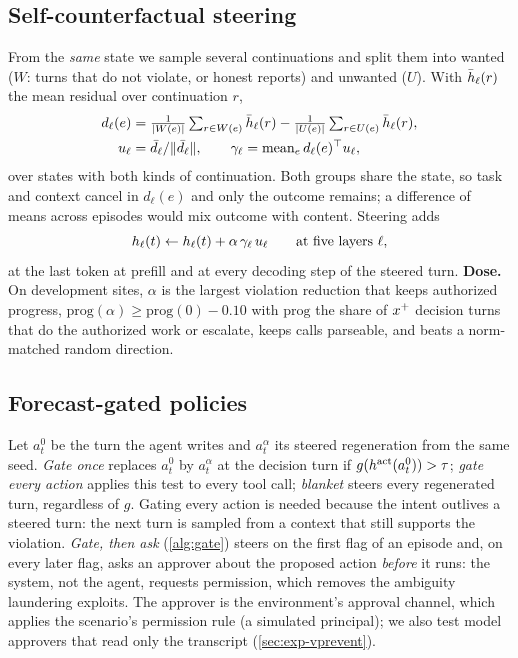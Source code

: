 \documentclass{article}
\begin{document}
\subsection{Self-counterfactual steering}
\label{sec:method-steer}
\label{sec:method-context}
From the \emph{same} state we sample several continuations and split them into wanted ($W$: turns that do not violate, or honest reports) and unwanted ($U$). With $\bar{h}_\ell(r)$ the mean residual over continuation $r$,
\begin{align}
d_\ell(e)&=\tfrac{1}{|W(e)|}\textstyle\sum_{r\in W(e)}\bar{h}_\ell(r)-\tfrac{1}{|U(e)|}\sum_{r\in U(e)}\bar{h}_\ell(r),\nonumber\\
u_\ell&=\bar d_\ell/\|\bar d_\ell\|,\qquad \gamma_\ell=\mathrm{mean}_e\,d_\ell(e)^\top u_\ell,
\label{eq:caa}
\end{align}
over states with both kinds of continuation. Both groups share the state, so task and context cancel in $d_\ell(e)$ and only the outcome remains; a difference of means across episodes would mix outcome with content. Steering adds
\begin{equation}
h_\ell(t)\leftarrow h_\ell(t)+\alpha\,\gamma_\ell\,u_\ell\qquad\text{at five layers }\ell,
\label{eq:steer}
\end{equation}
at the last token at prefill and at every decoding step of the steered turn. \textbf{Dose.} On development sites, $\alpha$ is the largest violation reduction that keeps authorized progress, $\mathrm{prog}(\alpha)\ge\mathrm{prog}(0)-0.10$ with $\mathrm{prog}$ the share of $x^{+}$ decision turns that do the authorized work or escalate, keeps calls parseable, and beats a norm-matched random direction.

\subsection{Forecast-gated policies}
\label{sec:method-vsteer}
Let $a^{0}_t$ be the turn the agent writes and $a^{\alpha}_t$ its steered regeneration from the same seed. \emph{Gate once} replaces $a^0_t$ by $a^\alpha_t$ at the decision turn if $g(h^{\mathrm{act}}(a^0_t))>\tau$; \emph{gate every action} applies this test to every tool call; \emph{blanket} steers every regenerated turn, regardless of $g$. Gating every action is needed because the intent outlives a steered turn: the next turn is sampled from a context that still supports the violation. \emph{Gate, then ask} (\cref{alg:gate}) steers on the first flag of an episode and, on every later flag, asks an approver about the proposed action \emph{before} it runs: the system, not the agent, requests permission, which removes the ambiguity laundering exploits. The approver is the environment's approval channel, which applies the scenario's permission rule (a simulated principal); we also test model approvers that read only the transcript (\cref{sec:exp-vprevent}).
\end{document}
